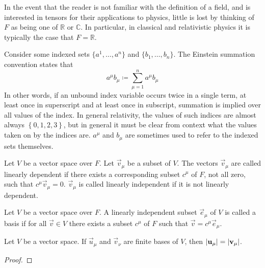 \documentclass[../main.tex]{subfiles}
\begin{document}
    In the event that the reader is not familiar with the definition of a field, and is interested in tensors for their applications to physics, little is lost by thinking of \(F\) as being one of \(\mathbb{R}\) or \(\mathbb{C}\). In particular, in classical and relativistic physics it is typically the case that \(F = \mathbb{R}\).

    \begin{notation}
        Consider some indexed sets \(\{a^{1}, \dots, a^{n}\}\) and \(\{b_{1}, \dots, b_{n}\}\). The Einstein summation convention states that
        \begin{equation*}
            a^{\mu}b_{\mu} \coloneqq \sum_{\mu=1}^{n} a^{\mu}b_{\mu}
        \end{equation*}
        In other words, if an unbound index variable occurs twice in a single term, at least once in superscript and at least once in subscript, summation is implied over all values of the index. In general relativity, the values of such indices are almost always \(\left\{0, 1, 2, 3\right\}\), but in general it must be clear from context what the values taken on by the indices are. \(a^{\mu}\) and \(b_{\mu}\) are sometimes used to refer to the indexed sets themselves.
    \end{notation}

    \begin{definition}
        Let \(V\) be a vector space over \(F\). Let \(\vec{v}_{\mu}\) be a subset of \(V\). The vectors \(\vec{v}_{\mu}\) are called linearly dependent if there exists a corresponding subset \(c^{\mu}\) of \(F\), not all zero, such that \(c^{\mu}\vec{v}_{\mu} = 0\). \(\vec{v}_{\mu}\) is called linearly independent if it is not linearly dependent.
    \end{definition}

    \begin{definition}[Bases]
        Let \(V\) be a vector space over \(F\). A linearly independent subset \(\vec{e}_{\mu}\) of \(V\) is called a basis if for all \(\vec{v} \in V\) there exists a subset \(c^{\mu}\) of \(F\) such that \(\vec{v} = c^{\mu}\vec{e}_{\mu}\).
    \end{definition}

    \begin{theorem}
        Let \(V\) be a vector space. If \(\vec{u}_{\mu}\) and \(\vec{v}_{\nu}\) are finite bases of \(V\), then \(\lvert\mathbf{u}_{\mu}\rvert=\lvert\mathbf{v}_{\mu}\rvert\).
        \begin{proof}
        \end{proof}
    \end{theorem}
\end{document}
